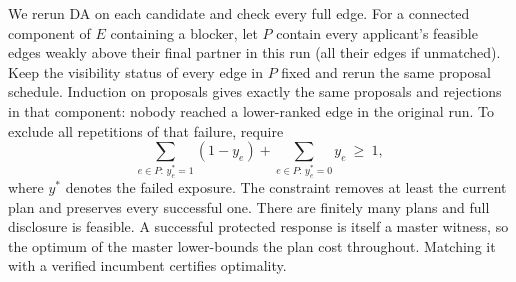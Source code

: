We rerun DA on each candidate and check every full edge. For a connected component of $E$ containing a blocker, let $P$ contain every applicant's feasible edges weakly above their final partner in this run (all their edges if unmatched). Keep the visibility status of every edge in $P$ fixed and rerun the same proposal schedule. Induction on proposals gives exactly the same proposals and rejections in that component: nobody reached a lower-ranked edge in the original run. To exclude all repetitions of that failure, require
\[
   \sum_{e\in P:\,y_e^*=1}(1-y_e)+
   \sum_{e\in P:\,y_e^*=0}y_e\ \geq\ 1 ,
\]
where $y^*$ denotes the failed exposure. The constraint removes at least the current plan and preserves every successful one. There are finitely many plans and full disclosure is feasible. A successful protected response is itself a master witness, so the optimum of the master lower-bounds the plan cost throughout. Matching it with a verified incumbent certifies optimality.
